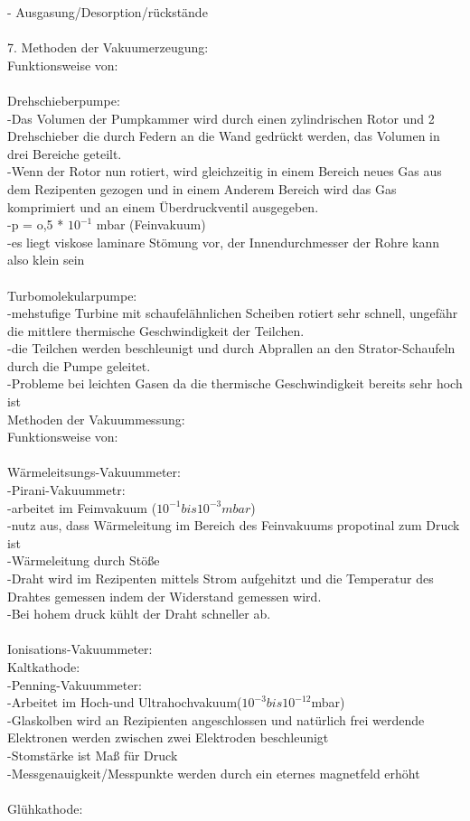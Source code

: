 		- Ausgasung/Desorption/rückstände\\
\\
	7. Methoden der Vakuumerzeugung:\\
		Funktionsweise von:\\
\\
		Drehschieberpumpe:\\
			-Das Volumen der Pumpkammer wird durch einen zylindrischen Rotor und 2 Drehschieber die durch Federn an die Wand gedrückt werden, das Volumen in drei Bereiche geteilt. \\
			-Wenn der Rotor nun rotiert, wird gleichzeitig in einem Bereich neues Gas aus dem Rezipenten gezogen und in einem Anderem Bereich wird das Gas komprimiert und an einem Überdruckventil ausgegeben.\\
			-p = o,5 * $10^{-1}$ mbar (Feinvakuum)\\
			-es liegt viskose laminare Stömung vor, der Innendurchmesser der Rohre kann also klein sein\\
			\\
		Turbomolekularpumpe:\\
			-mehstufige Turbine mit schaufelähnlichen Scheiben rotiert sehr schnell, ungefähr die mittlere thermische Geschwindigkeit der Teilchen.\\
			-die Teilchen werden beschleunigt und durch Abprallen an den Strator-Schaufeln durch die Pumpe geleitet.\\
			-Probleme bei leichten Gasen da die thermische Geschwindigkeit bereits sehr hoch ist\\

	   Methoden der Vakuummessung:\\
	   	Funktionsweise von:\\
\\
		Wärmeleitsungs-Vakuummeter:\\
			-Pirani-Vakuummetr:\\
				-arbeitet im Feimvakuum ($10^{-1} bis 10^{-3}mbar$)\\
				-nutz aus, dass Wärmeleitung im Bereich des Feinvakuums propotinal zum Druck ist\\
				-Wärmeleitung durch Stöße\\
				-Draht wird im Rezipenten mittels Strom aufgehitzt und die Temperatur des Drahtes gemessen indem der Widerstand gemessen wird.\\
				-Bei hohem druck kühlt der Draht schneller ab.\\
				\\
		Ionisations-Vakuummeter:\\
			Kaltkathode:\\
				-Penning-Vakuummeter:\\
					-Arbeitet im Hoch-und Ultrahochvakuum($10^{-3} bis 10^{-12}$mbar)\\
					-Glaskolben wird an Rezipienten angeschlossen und natürlich frei werdende Elektronen werden zwischen zwei Elektroden beschleunigt\\
					-Stomstärke ist Maß für Druck\\
					-Messgenauigkeit/Messpunkte werden durch ein eternes magnetfeld erhöht\\
					\\
			Glühkathode:\\
